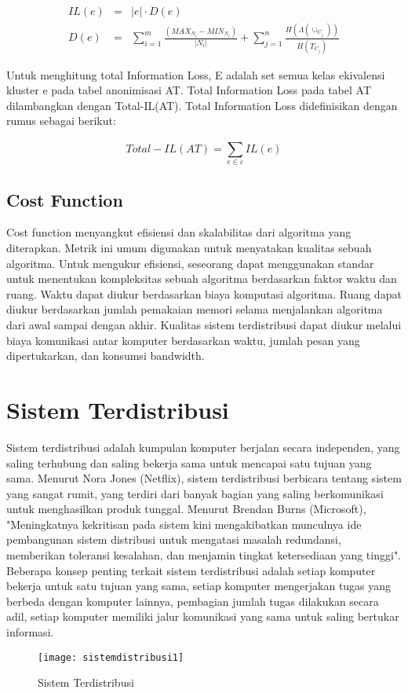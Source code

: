 \begin{eqnarray}
IL(e)&=& |e| \cdot D(e) \\
D(e) &=& \sum_{i=1}^{m} \frac{(MAX_{N_i} - MIN_{N_i})}{|N_i|} + \sum_{j=1}^{n}\frac{H(\Lambda(\cup_{C_j}))}{H(T_{C_j})}
\end{eqnarray}

\par Untuk menghitung total Information Loss,  E adalah set semua kelas ekivalensi kluster e pada tabel anonimisasi AT. Total Information Loss pada tabel AT dilambangkan dengan Total-IL(AT). Total Information Loss didefinisikan dengan rumus sebagai berikut:

\begin{equation}
Total-IL(AT) = \sum_{e \in \varepsilon}^{}  IL(e)
\end{equation}


\subsection{Cost Function} 
Cost function menyangkut efisiensi dan skalabilitas dari algoritma yang diterapkan. Metrik ini umum digunakan untuk menyatakan kualitas sebuah algoritma. Untuk mengukur efisiensi, seseorang dapat menggunakan standar untuk menentukan kompleksitas sebuah algoritma berdasarkan faktor waktu dan ruang. Waktu dapat diukur berdasarkan biaya komputasi algoritma. Ruang dapat diukur berdasarkan jumlah pemakaian memori selama menjalankan algoritma dari awal sampai dengan akhir. Kualitas sistem terdistribusi dapat diukur melalui biaya komunikasi antar komputer berdasarkan waktu,  jumlah pesan yang dipertukarkan, dan konsumsi bandwidth. 
 
\section{Sistem Terdistribusi}
Sistem terdistribusi adalah kumpulan komputer berjalan secara independen, yang saling terhubung dan saling bekerja sama untuk mencapai satu tujuan yang sama. Menurut Nora Jones (Netflix), sistem terdistribusi berbicara tentang sistem yang sangat rumit, yang terdiri dari banyak bagian yang saling berkomunikasi untuk menghasilkan produk tunggal. Menurut Brendan Burns (Microsoft), "Meningkatnya kekritisan pada sistem kini mengakibatkan munculnya ide pembangunan sistem distribusi untuk mengatasi masalah redundansi, memberikan toleransi kesalahan, dan menjamin tingkat ketersediaan yang tinggi". Beberapa konsep penting terkait sistem terdistribusi adalah setiap komputer bekerja untuk satu tujuan yang sama, setiap komputer mengerjakan tugas yang berbeda dengan komputer lainnya, pembagian jumlah tugas dilakukan secara adil, setiap komputer memiliki jalur komunikasi yang sama untuk saling bertukar informasi.
\\
\begin{figure}[H]
	\centering
	\texttt{[image: sistemdistribusi1]}
	\caption{Sistem Terdistribusi}
	\label{fig:rnaalgorithm}
\end{figure}

